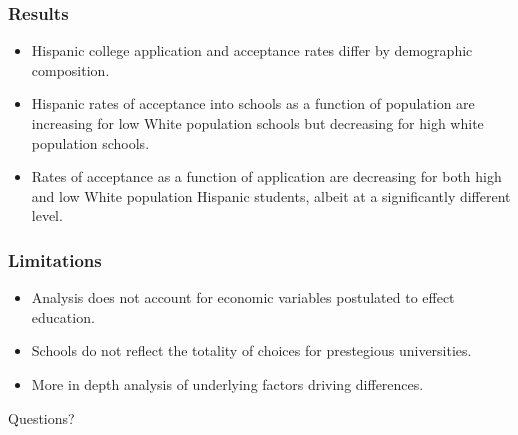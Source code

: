 \documentclass{beamer}
\begin{document}

\begin{frame}
\frametitle{Results}
\begin{itemize}
  \item Hispanic college application and acceptance rates differ by demographic composition.
  \item Hispanic rates of acceptance into schools as a function of population are increasing for low White population schools but decreasing for high white population schools.
  \item Rates of acceptance as a function of application are decreasing for both high and low White population Hispanic students, albeit at a significantly different level.
\end{itemize}
\end{frame}


\begin{frame}
\frametitle{Limitations}
\begin{itemize}
  \item Analysis does not account for economic variables postulated to effect education.
  \item Schools do not reflect the totality of choices for prestegious universities.
  \item More in depth analysis of underlying factors driving differences.
\end{itemize}
\end{frame}

\begin{frame}
\Huge{\centerline{Questions?}}
\end{frame}

\end{document}
